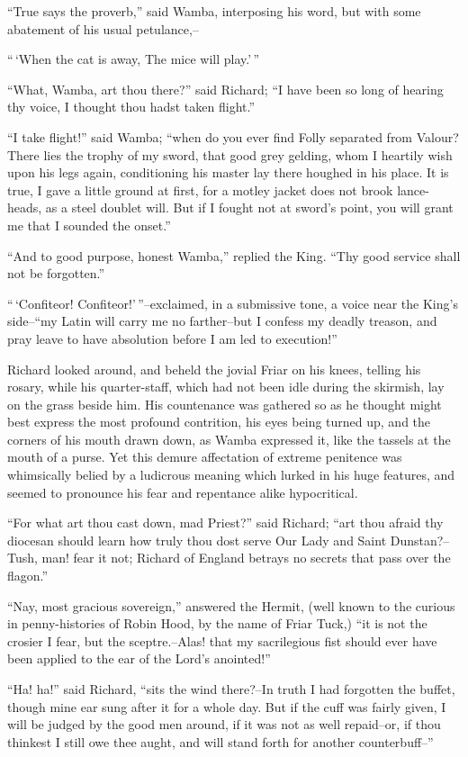 ``True says the proverb,'' said Wamba, interposing his word, but with
some abatement of his usual petulance,--

``\,`When the cat is away, The mice will play.'\,''

``What, Wamba, art thou there?'' said Richard; ``I have been so long of
hearing thy voice, I thought thou hadst taken flight.''

``I take flight!'' said Wamba; ``when do you ever find Folly separated
from Valour? There lies the trophy of my sword, that good grey gelding,
whom I heartily wish upon his legs again, conditioning his master lay
there houghed in his place. It is true, I gave a little ground at first,
for a motley jacket does not brook lance-heads, as a steel doublet will.
But if I fought not at sword's point, you will grant me that I sounded
the onset.''

``And to good purpose, honest Wamba,'' replied the King. ``Thy good
service shall not be forgotten.''

``\,`Confiteor! Confiteor!'\,''--exclaimed, in a submissive tone, a
voice near the King's side--``my Latin will carry me no farther--but I
confess my deadly treason, and pray leave to have absolution before I am
led to execution!''

Richard looked around, and beheld the jovial Friar on his knees, telling
his rosary, while his quarter-staff, which had not been idle during the
skirmish, lay on the grass beside him. His countenance was gathered so
as he thought might best express the most profound contrition, his eyes
being turned up, and the corners of his mouth drawn down, as Wamba
expressed it, like the tassels at the mouth of a purse. Yet this demure
affectation of extreme penitence was whimsically belied by a ludicrous
meaning which lurked in his huge features, and seemed to pronounce his
fear and repentance alike hypocritical.

``For what art thou cast down, mad Priest?'' said Richard; ``art thou
afraid thy diocesan should learn how truly thou dost serve Our Lady and
Saint Dunstan?--Tush, man! fear it not; Richard of England betrays no
secrets that pass over the flagon.''

``Nay, most gracious sovereign,'' answered the Hermit, (well known to
the curious in penny-histories of Robin Hood, by the name of Friar
Tuck,) ``it is not the crosier I fear, but the sceptre.--Alas! that my
sacrilegious fist should ever have been applied to the ear of the Lord's
anointed!''

``Ha! ha!'' said Richard, ``sits the wind there?--In truth I had
forgotten the buffet, though mine ear sung after it for a whole day. But
if the cuff was fairly given, I will be judged by the good men around,
if it was not as well repaid--or, if thou thinkest I still owe thee
aught, and will stand forth for another counterbuff--''

